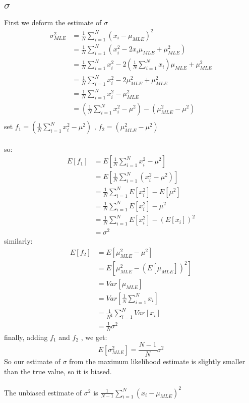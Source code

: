\documentclass{report}
\begin{document}
\subsection{$\sigma$}
First we deform the estimate of $\sigma$
$$
\begin{aligned}
\sigma_{MLE}^2
&=\frac{1}{N} \sum_{i=1} ^N (x_i - \mu_{MLE})^2\\
&=\frac{1}{N} \sum_{i=1} ^N (x_i^2 - 2x_i\mu_{MLE} + \mu_{MLE}^2)\\
&=\frac{1}{N} \sum_{i=1}^N x_i^2 - 2(\frac{1}{N} \sum_{i=1} ^N x_i) \mu_{MLE} + \mu_{MLE}^2\\
&=\frac{1}{N} \sum_{i=1}^N x_i^2 - 2\mu_{MLE}^2 + \mu_{MLE}^2\\
&=\frac{1}{N} \sum_{i=1}^N x_i^2 - \mu_{MLE}^2\\
&=(\frac{1}{N} \sum_{i=1}^N x_i^2-\mu^2) - (\mu_{MLE}^2-\mu^2)\\
\end{aligned}
$$
set $f_1=(\frac{1}{N} \sum_{i=1}^N x_i^2-\mu^2)$ , $f_2=(\mu_{MLE}^2-\mu^2)$\\\\
so:
$$
\begin{aligned}
E[f_1]
&=E[\frac{1}{N} \sum_{i=1}^N x_i^2 - \mu^2]\\
&=E[\frac{1}{N} \sum_{i=1}^N (x_i^2 - \mu^2)]\\
&=\frac{1}{N} \sum_{i=1}^N E[x_i^2] - E[\mu^2]\\
&=\frac{1}{N} \sum_{i=1}^N E[x_i^2] - \mu^2\\
&=\frac{1}{N} \sum_{i=1}^N E[x_i^2] - (E[x_i])^2\\
&=\sigma^2
\end{aligned}
$$
similarly:
$$
\begin{aligned}
E[f_2]
&=E[\mu_{MLE}^2 - \mu^2]\\
&=E[\mu_{MLE}^2 - (E[\mu_{MLE}])^2]\\
&=Var[\mu_{MLE}]\\
&=Var[\frac{1}{N} \sum_{i=1} ^N x_i]\\
&=\frac{1}{N^2} \sum_{i=1} ^N Var[x_i]\\
&=\frac{1}{N} \sigma^2
\end{aligned}
$$
finally, adding $f_1$ and $f_2$ , we get:
$$
E[\sigma_{MLE}^2]=\frac{N-1}{N} \sigma^2
$$
So our estimate of $\sigma$ from the maximum likelihood estimate is slightly smaller than the true value, so it is biased.\\\\
The unbiased estimate of $\sigma^2$ is $\frac{1}{N-1}\sum_{i=1}^N (x_i-\mu_{MLE})^2$
\end{document}
